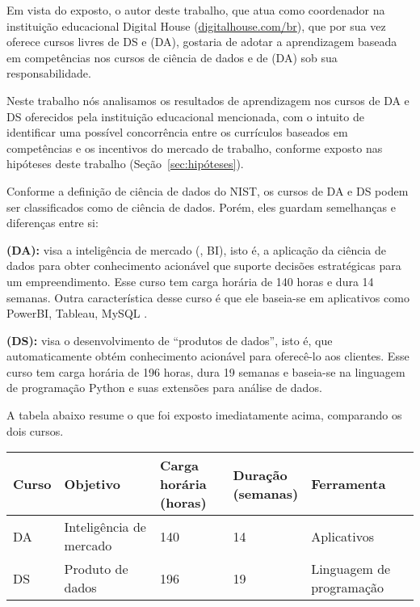 Em vista do exposto, o autor deste trabalho, que atua como coordenador na instituição educacional Digital House (\url{digitalhouse.com/br}), que por sua vez oferece cursos livres de DS e  (DA), gostaria de adotar a aprendizagem baseada em competências nos cursos de ciência de dados e de  (DA) sob sua responsabilidade.

Neste trabalho nós analisamos os resultados de aprendizagem nos cursos de DA e DS oferecidos pela instituição educacional mencionada, com o intuito de identificar uma possível concorrência entre os currículos baseados em competências e os incentivos do mercado de trabalho, conforme exposto nas hipóteses deste trabalho (Seção~\ref{sec:hipóteses}).

Conforme a definição de ciência de dados do NIST, os cursos de DA e DS podem ser classificados como de ciência de dados.
Porém, eles guardam semelhanças e diferenças entre si:
\begin{compactitem}
	\item \textbf{ (DA):} visa a inteligência de mercado (, BI), isto é, a aplicação da ciência de dados para obter conhecimento acionável que suporte decisões estratégicas para um empreendimento.
	Esse curso tem carga horária de 140 horas e dura 14 semanas.
	Outra característica desse curso é que ele baseia-se em aplicativos como PowerBI, Tableau, MySQL \etc.

	\item \textbf{ (DS):} visa o desenvolvimento de ``produtos de dados'', isto é,  que automaticamente obtém conhecimento acionável para oferecê-lo aos clientes.
	Esse curso tem carga horária de 196 horas, dura 19 semanas e baseia-se na linguagem de programação Python e suas extensões para análise de dados.
\end{compactitem}

A tabela abaixo resume o que foi exposto imediatamente acima, comparando os dois cursos.

{\footnotesize
\noindent%
\begin{tabular}{lllll}
	\toprule
	Curso & Objetivo & \shortstack[l]{Carga\\horária (horas)} & \shortstack[c]{Duração\\(semanas)} & Ferramenta\\
	\midrule
	DA & Inteligência de mercado & 140 & 14 & Aplicativos\\
	DS & Produto de dados & 196 & 19 & Linguagem de programação	\\
	\bottomrule
\end{tabular}
}